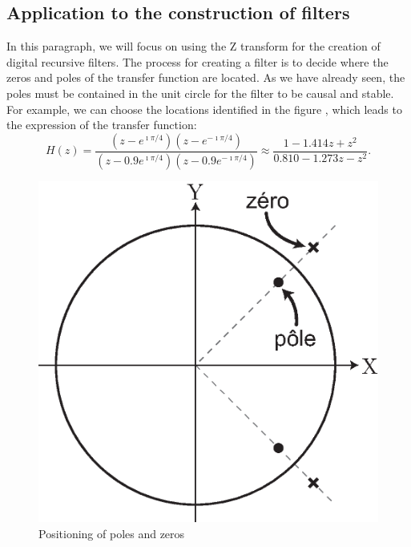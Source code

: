 \subsection{Application to the construction of filters}
 
 
In this paragraph, we will focus on using the Z transform for the creation of digital recursive filters. The process for creating a filter is to decide where the zeros and poles of the transfer function are located. As we have already seen, the poles must be contained in the unit circle for the filter to be causal and stable. For example, we can choose the locations identified in the figure , which leads to the expression of the transfer function:
\begin{equation*}
H (z) = \frac{(z - e^{\imath \pi / 4}) (z - e^{- \imath \pi / 4})}{(z - 0.9 e^{\imath \pi / 4}) (z - 0.9 e^{- \imath \pi / 4})} \approx \frac{1 - 1.414 z + z^2}{0.810 - 1.273 z -z^2}.
\end{equation*}
\begin{figure}[ht] 
    \begin{center}
    \includegraphics[scale=0.5]{images/emplacement-poles-notch-filter.eps}
    \end{center}
    \caption{Positioning of poles and zeros}
              \label{fig-location-poles-notch-filter}
\end{figure}
